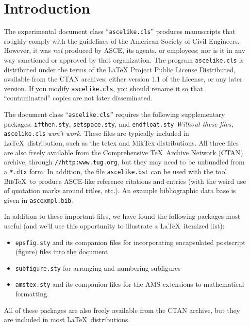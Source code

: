 \documentclass[Proceedings]{ascelike}
\begin{document}
\section{Introduction}
The experimental document class ``\texttt{ascelike.cls}''
produces manuscripts that roughly comply with the
guidelines of the American Society of Civil Engineers.
However, it was \emph{not} produced by ASCE, its agents,
or employees;
nor is it in any way sanctioned or approved by that organization.
The program \texttt{ascelike.cls} is distributed under the
terms of the LaTeX Project Public License Distributed,
available from the CTAN archives;
either version 1.1 of the License, or any later version.
If you modify
\texttt{ascelike.cls}, you should rename it so that ``contaminated''
copies are not later disseminated.
\par
The document class ``\texttt{ascelike.cls}'' requires the following
supplementary packages:
\texttt{ifthen.sty}, \texttt{setspace.sty}, and \texttt{endfloat.sty}
\emph{Without these files,} \texttt{ascelike.cls} \emph{won't work}.
These files are typically included in \LaTeX\ distribution, such as the
\textsf{tetex} and \textsf{MikTex} distributions.
All three files are also freely available
from the Comprehensive \TeX\ Archive Network (CTAN) archive,
through \verb+//http:www.tug.org+, but they may need to be unbundled from
a \verb+*.dtx+ form.
In addition, the file \texttt{ascelike.bst} can be used with
the tool \textsc{Bib}\TeX\ to produce ASCE-like 
reference citations and entries (with the weird use of
quotation marks around titles, etc.).
An example bibliographic data base is given in \texttt{ascexmpl.bib}.
\par
In addition to these important files,
we have found the following packages most useful (and we'll use this
opportunity to illustrate a \LaTeX\ itemized list):
%
\begin{itemize}
\item
\texttt{epsfig.sty} and its companion files for incorporating
encapsulated post\-script (figure) files into the document
\item
\texttt{subfigure.sty} for arranging and numbering subfigures
\item
\texttt{amstex.sty} and its companion files for the AMS extensions
to mathematical formatting.
\end{itemize}
%
All of these packages are also freely 
available from the CTAN archive, 
but they are included in most \LaTeX\ distributions.
%
\end{document}
